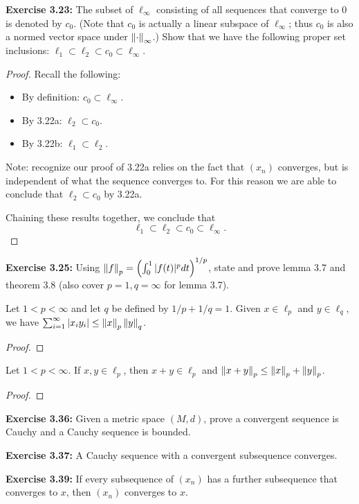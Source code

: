\documentclass{exam}
\begin{document}
\begin{questions}
    \newpage
    \question \textbf{Exercise 3.23:} The subset of $\ell_\infty$ consisting of all sequences that converge to 0 is denoted by $c_0$. (Note that $c_0$ is
    actually a linear subspace of $\ell_\infty$; thus $c_0$ is also a normed vector space under $\left\| \cdot \right\|_\infty$.) Show that
    we have the following proper set inclusions: $\ell_1 \subset \ell_2 \subset c_0 \subset \ell_\infty$.
    \begin{proof}
        Recall the following:
        \begin{itemize}
        \item By definition: $c_0 \subset \ell_\infty$.
        \item By 3.22a: $\ell_2 \subset c_0$.
        \item By 3.22b: $\ell_1 \subset \ell_2$.
        \end{itemize}

        Note: recognize our proof of 3.22a relies on the fact that $(x_n)$ converges, but is independent of what the sequence
        converges to. For this reason we are able to conclude that $\ell_2 \subset c_0$ by 3.22a.

        Chaining these results together, we conclude that
        $$\ell_1 \subset \ell_2 \subset c_0 \subset \ell_\infty.$$
    \end{proof}


    \newpage
    \question \textbf{Exercise 3.25:} Using $\left\| f \right\|_p = \left( \int_0^1 |f(t)|^p dt \right)^{1 / p}$, state and prove lemma 3.7 and theorem 3.8 (also cover $p = 1, q = \infty$ for lemma 3.7).
    \noqed
    \setcounter{section}{3}
    \setcounter{lemma}{6}
    \begin{lemma}\label{lemma:main}
        Let $1 < p < \infty$ and let $q$ be defined by $1 / p + 1 / q = 1$. Given $x\in \ell_p$ and $y\in\ell_q$, we have 
        $\sum_{i = 1}^\infty |x_iy_i| \leq \left\| x \right\|_p\left\| y \right\|_q$.
    \end{lemma}
    \yesqed
    \begin{proof}
    \end{proof}

    \noqed
    \begin{theorem}\label{thm:main}
        Let $1 < p < \infty$. If $x, y\in \ell_p$, then $x + y\in \ell_p$ and $\left\| x + y \right\|_p \leq \left\| x \right\|_p + \left\| y \right\|_p$.
    \end{theorem}
    \yesqed
    \begin{proof}
    \end{proof}


    \newpage
    \question \textbf{Exercise 3.36:} Given a metric space $(M, d)$, prove a convergent sequence is Cauchy and a Cauchy sequence is bounded.


    \newpage
    \question \textbf{Exercise 3.37:} A Cauchy sequence with a convergent subsequence converges.


    \newpage
    \question \textbf{Exercise 3.39:} If every subsequence of $(x_n)$ has a further subsequence that converges to $x$, then $(x_n)$ converges to $x$.


\end{questions}
\end{document}
